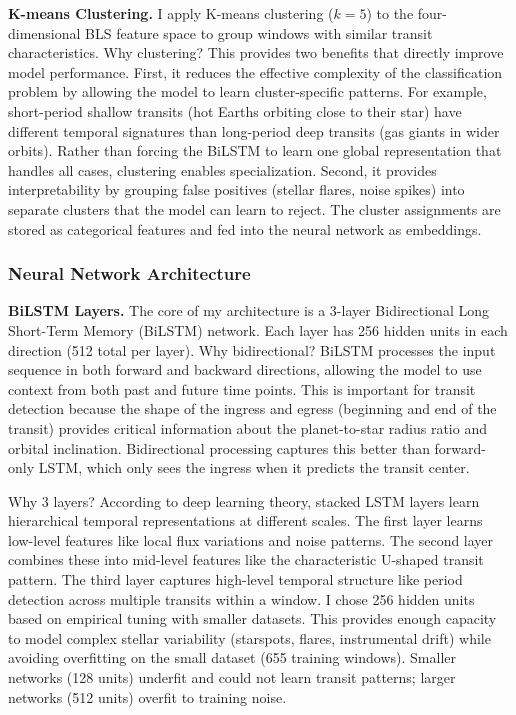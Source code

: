 \documentclass[letterpaper]{article} %
\begin{document}
\textbf{K-means Clustering.} I apply K-means clustering ($k=5$) to the four-dimensional BLS feature space to group windows with similar transit characteristics. Why clustering? This provides two benefits that directly improve model performance. First, it reduces the effective complexity of the classification problem by allowing the model to learn cluster-specific patterns. For example, short-period shallow transits (hot Earths orbiting close to their star) have different temporal signatures than long-period deep transits (gas giants in wider orbits). Rather than forcing the BiLSTM to learn one global representation that handles all cases, clustering enables specialization. Second, it provides interpretability by grouping false positives (stellar flares, noise spikes) into separate clusters that the model can learn to reject. The cluster assignments are stored as categorical features and fed into the neural network as embeddings.

\subsubsection{Neural Network Architecture}

\textbf{BiLSTM Layers.} The core of my architecture is a 3-layer Bidirectional Long Short-Term Memory (BiLSTM) network. Each layer has 256 hidden units in each direction (512 total per layer). Why bidirectional? BiLSTM processes the input sequence in both forward and backward directions, allowing the model to use context from both past and future time points. This is important for transit detection because the shape of the ingress and egress (beginning and end of the transit) provides critical information about the planet-to-star radius ratio and orbital inclination. Bidirectional processing captures this better than forward-only LSTM, which only sees the ingress when it predicts the transit center.

Why 3 layers? According to deep learning theory, stacked LSTM layers learn hierarchical temporal representations at different scales. The first layer learns low-level features like local flux variations and noise patterns. The second layer combines these into mid-level features like the characteristic U-shaped transit pattern. The third layer captures high-level temporal structure like period detection across multiple transits within a window. I chose 256 hidden units based on empirical tuning with smaller datasets. This provides enough capacity to model complex stellar variability (starspots, flares, instrumental drift) while avoiding overfitting on the small dataset (655 training windows). Smaller networks (128 units) underfit and could not learn transit patterns; larger networks (512 units) overfit to training noise.
\end{document}
